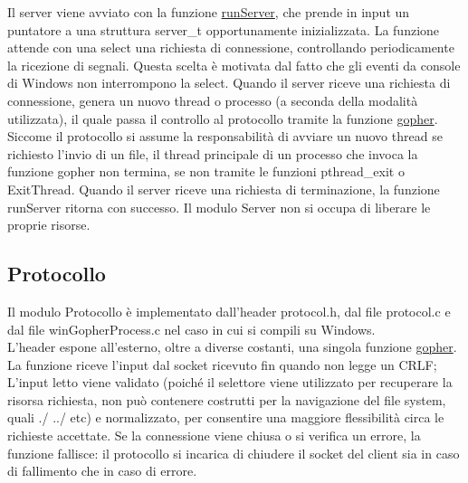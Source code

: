 \documentclass{article}
\begin{document}
Il server viene avviato con la funzione \href{html/server_8h.html#a533c9a4292e9d1106ff7c54fbf75090a}{runServer},
che prende in input un puntatore a una struttura server\_t opportunamente inizializzata.
La funzione attende con una select una richiesta di connessione, controllando periodicamente la ricezione
di segnali. Questa scelta è motivata dal fatto che gli eventi da console di Windows non interrompono la select.
Quando il server riceve una richiesta di connessione, genera un nuovo thread o processo (a seconda della modalità
utilizzata), il quale passa il controllo al protocollo tramite la funzione \href{html/protocol_8h.html#a733e68cc8d5f947c30d0ca51e1b76d9b}
{gopher}. Siccome il protocollo si assume la responsabilità di avviare un nuovo thread se richiesto
l'invio di un file, il thread principale di un processo che invoca la funzione gopher non termina,
se non tramite le funzioni pthread\_exit o ExitThread. Quando il server riceve una richiesta di terminazione, 
la funzione runServer ritorna con successo. Il modulo Server non si occupa di liberare le proprie risorse.

\subsection{Protocollo}

Il modulo Protocollo è implementato dall'header protocol.h, dal file protocol.c e dal file winGopherProcess.c 
nel caso in cui si compili su Windows.\\
L'header espone all'esterno, oltre a diverse costanti, una singola funzione \href{html/protocol_8h.html#a733e68cc8d5f947c30d0ca51e1b76d9b}{gopher}.
La funzione riceve l'input dal socket ricevuto fin quando non legge un CRLF;
L'input letto viene validato (poiché il selettore viene utilizzato per recuperare la risorsa
richiesta, non può contenere costrutti per la navigazione del file system, quali ./ ../ etc) e normalizzato,
per consentire una maggiore flessibilità circa le richieste accettate.
Se la connessione viene chiusa o si verifica un errore, la funzione fallisce:
il protocollo si incarica di chiudere il socket del client sia in caso di fallimento che in caso di errore.
\end{document}
